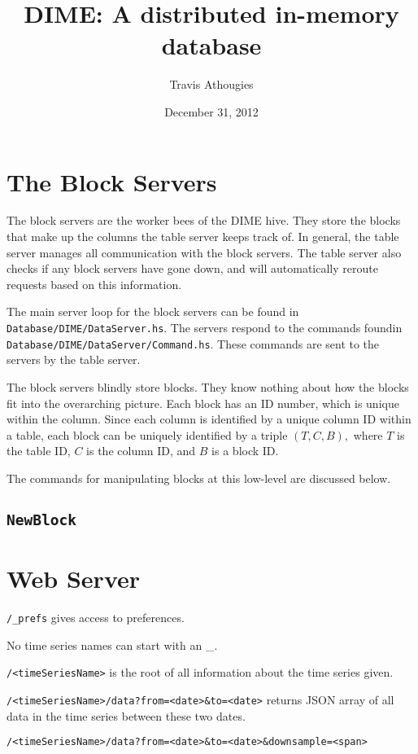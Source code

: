 \documentclass{article}
\newcommand{\filepath}[1]{\texttt{#1}}
\newcommand{\command}[1]{\texttt{#1}}
\begin{document}
\title{DIME: A distributed in-memory database}
\author{Travis Athougies}
\date{December 31, 2012}
\maketitle

\section{The Block Servers}

The block servers are the worker bees of the DIME hive. They store the blocks that make up the
columns the table server keeps track of. In general, the table server manages all communication with
the block servers. The table server also checks if any block servers have gone down, and will
automatically reroute requests based on this information.

The main server loop for the block servers can be found in
\filepath{Database/DIME/DataServer.hs}. The servers respond to the commands foundin
\filepath{Database/DIME/DataServer/Command.hs}. These commands are sent to the servers by the table
server.

The block servers blindly store blocks. They know nothing about how the blocks fit into the
overarching picture. Each block has an ID number, which is unique within the column. Since each
column is identified by a unique column ID within a table, each block can be uniquely identified by
a triple $(T, C, B),$ where $T$ is the table ID, $C$ is the column ID, and $B$ is a block ID.

The commands for manipulating blocks at this low-level are discussed below.

\subsection{\command{NewBlock}}

\section{Web Server}

\texttt{/_prefs} gives access to preferences.

No time series names can start with an \_.

\texttt{/<timeSeriesName>} is the root of all information about the time series given.

\texttt{/<timeSeriesName>/data?from=<date>\&to=<date>} returns JSON array of all data in the time
series between these two dates.

\texttt{/<timeSeriesName>/data?from=<date>\&to=<date>\&downsample=<span>}
\end{document}
